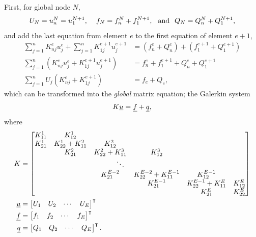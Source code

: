 First, for global node $N$,
$$U_N = u_n^{N} = u_1^{N+1}, \hspace{4mm} f_N = f_n^{N} + f_1^{N+1}, \hspace{2.5mm} \text{and} \hspace{2.5mm} Q_N = Q_n^{N} + Q_1^{N+1},$$
and add the last equation from element $e$ to the first equation of element $e+1$,
\begin{align*}
  \sum_{j=1}^n K_{nj}^e u_j^e + \sum_{j=1}^n K_{1j}^{e+1} u_j^{e+1} &= \left( f_n^e + Q_n^e \right) + \left( f_1^{e+1} + Q_1^{e+1} \right) \\
  \sum_{j=1}^n \left( K_{nj}^e u_j^e + K_{1j}^{e+1} u_j^{e+1} \right) &= f_n^e + f_1^{e+1} + Q_n^e + Q_1^{e+1} \\
  \sum_{j=1}^n U_j \left( K_{nj}^e + K_{1j}^{e+1} \right) &= f_e + Q_e,
\end{align*}
which can be transformed into the  \emph{global} matrix equation; the Galerkin system
\begin{align}
  \label{intro_galerkin_system}
  K\underline{u} = \underline{f} + \underline{q},
\end{align}
where
{\tiny
\begin{align*}
  K &=
  \begin{bmatrix}
    K_{11}^1 & K_{12}^1            &                                                   &                         &            \\
    K_{21}^1 & K_{22}^1 + K_{11}^2 & K_{12}^2            &                             &                         &            \\
             & K_{21}^2            & K_{22}^2 + K_{11}^3 & K_{12}^3                    &                         &            \\
             &                     & \hspace{10mm}\ddots &                             &                         &            \\ 
             &                     & K_{21}^{E-2}        & K_{22}^{E-2} + K_{11}^{E-1} & K_{12}^{E-1}            &            \\
             &                     &                     & K_{21}^{E-1}                & K_{22}^{E-1} + K_{11}^E & K_{12}^E   \\
             &                     &                     &                             & K_{21}^{E}              & K_{22}^{E} 
  \end{bmatrix} \\
  \rankone{u} &= \begin{bmatrix} U_1 & U_2 & \cdots & U_E \end{bmatrix}\T \\
  \rankone{f} &= \begin{bmatrix} f_1 & f_2 & \cdots & f_E \end{bmatrix}\T \\
  \rankone{q} &= \begin{bmatrix} Q_1 & Q_2 & \cdots & Q_E \end{bmatrix}\T.
\end{align*}}

